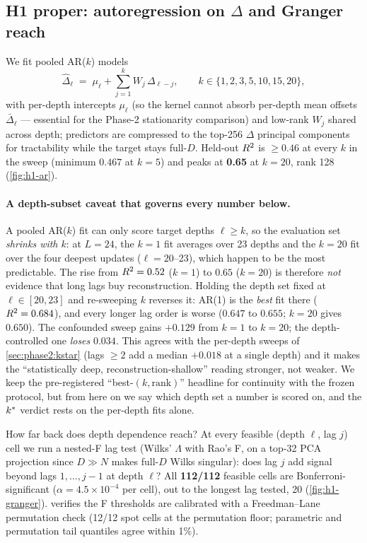 \subsection{H1 proper: autoregression on \texorpdfstring{$\Delta$}{Delta} and
Granger reach}
\label{sec:phase1:ar}

We fit pooled AR($k$) models
\[
  \hat\Delta_\ell \;=\; \mu_\ell + \sum_{j=1}^{k} W_j\, \Delta_{\ell-j},
  \qquad k \in \{1,2,3,5,10,15,20\},
\]
with per-depth intercepts $\mu_\ell$ (so the kernel cannot absorb per-depth
mean offsets $\bar\Delta_\ell$ --- essential for the Phase-2 stationarity
comparison) and low-rank $W_j$ shared across depth; predictors are compressed
to the top-256 $\Delta$ principal components for tractability while the target
stays full-$D$. Held-out $R^2$ is $\ge 0.46$ at every $k$ in the sweep
(minimum $0.467$ at $k{=}5$) and
peaks at \textbf{0.65} at $k=20$, rank 128 (\cref{fig:h1-ar}).

\paragraph{A depth-subset caveat that governs every number below.}
A pooled AR($k$) fit can only score target depths $\ell \ge k$, so the
evaluation set \emph{shrinks with $k$}: at $L=24$, the $k{=}1$ fit averages
over 23 depths and the $k{=}20$ fit over the four deepest updates
($\ell = 20$--23), which happen to be the most predictable. The rise from
$R^2 = 0.52$ ($k{=}1$) to $0.65$ ($k{=}20$) is therefore \emph{not} evidence
that long lags buy reconstruction. Holding the depth set fixed at
$\ell \in [20,23]$ and re-sweeping $k$ reverses it: AR(1) is the \emph{best}
fit there ($R^2 = 0.684$), and every longer lag order is worse ($0.647$ to
$0.655$; $k{=}20$ gives $0.650$). The confounded sweep gains $+0.129$ from
$k{=}1$ to $k{=}20$; the depth-controlled one \emph{loses} $0.034$. This
agrees with the per-depth sweeps of \cref{sec:phase2:kstar} (lags $\ge 2$ add
a median $+0.018$ at a single depth) and it makes the ``statistically deep,
reconstruction-shallow'' reading stronger, not weaker. We keep the
pre-registered ``best-$(k,\text{rank})$'' headline for continuity with the
frozen protocol, but from here on we say which depth set a number is scored
on, and the $k^{\ast}$ verdict rests on the per-depth fits alone.

How far back does depth dependence reach? At every feasible (depth $\ell$,
lag $j$) cell we run a nested-F lag test (Wilks' $\Lambda$ with Rao's F, on a
top-32 PCA projection since $D \gg N$ makes full-$D$ Wilks singular): does lag
$j$ add signal beyond lags $1,\dots,j{-}1$ at depth $\ell$? All
\textbf{112/112} feasible cells are Bonferroni-significant
($\alpha = 4.5\times10^{-4}$ per cell), out to the longest lag tested, 20
(\cref{fig:h1-granger}).  verifies the F thresholds are
calibrated with a Freedman--Lane permutation check (12/12 spot cells at the
permutation floor; parametric and permutation tail quantiles agree within
1\%).

